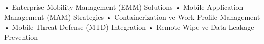 • Enterprise Mobility Management (EMM) Solutions
• Mobile Application Management (MAM) Strategies
• Containerization ve Work Profile Management
• Mobile Threat Defense (MTD) Integration
• Remote Wipe ve Data Leakage Prevention